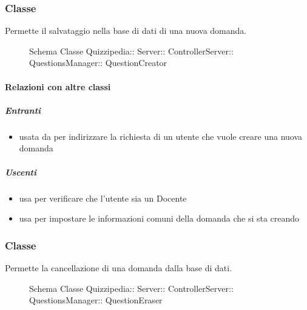 \subsubsection{Classe }
Permette il salvataggio nella base di dati di una nuova domanda.
\begin{figure}[H]
\centering
\noindent{}
\caption[Schema Classe QuestionCreator]{Schema Classe Quizzipedia:: Server:: ControllerServer:: QuestionsManager:: QuestionCreator}
\end{figure}
\paragraph{Relazioni con altre classi}
\subparagraph{Entranti}
\begin{itemize}
\item usata da  per indirizzare la richiesta di un utente che vuole creare una nuova domanda
\end{itemize}
\subparagraph{Uscenti}
\begin{itemize}
\item usa  per verificare che l'utente sia un Docente
\item usa  per impostare le informazioni comuni della domanda che si sta creando
\end{itemize}
\subsubsection{Classe }
Permette la cancellazione di una domanda dalla base di dati.
\begin{figure}[H]
\centering
\noindent{}
\caption[Schema Classe QuestionEraser]{Schema Classe Quizzipedia:: Server:: ControllerServer:: QuestionsManager:: QuestionEraser}
\end{figure}
